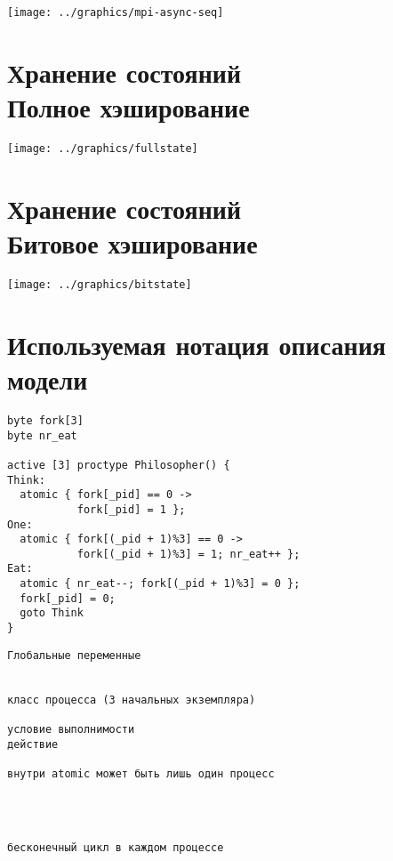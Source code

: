 \documentclass[12pt]{article}
\begin{document}
\begin{center}
  \texttt{[image: ../graphics/mpi-async-seq]}
\end{center}

\section{Хранение состояний \\ \small{Полное хэширование}}
\label{sec:fullstate}

\begin{center}
  \texttt{[image: ../graphics/fullstate]}
\end{center}

\section{Хранение состояний \\ \small{Битовое хэширование}}
\label{sec:buthash}

\begin{center}
  \texttt{[image: ../graphics/bitstate]}
\end{center}

\section{Используемая нотация описания модели}
\label{sec:promela-notation}


\begin{minipage}[t]{.53\textwidth}
\scriptsize
\begin{verbatim}
byte fork[3]
byte nr_eat

active [3] proctype Philosopher() { 
Think:
  atomic { fork[_pid] == 0 -> 
           fork[_pid] = 1 };
One:
  atomic { fork[(_pid + 1)%3] == 0 -> 
           fork[(_pid + 1)%3] = 1; nr_eat++ };
Eat:
  atomic { nr_eat--; fork[(_pid + 1)%3] = 0 };
  fork[_pid] = 0;
  goto Think
}
\end{verbatim}
\normalsize
\end{minipage}
%
\begin{minipage}[t]{.47\textwidth}
\scriptsize
\begin{verbatim}
Глобальные переменные


класс процесса (3 начальных экземпляра)

условие выполнимости
действие

внутри atomic может быть лишь один процесс




бесконечный цикл в каждом процессе

\end{verbatim}
\normalsize
\end{minipage}
\end{document}
